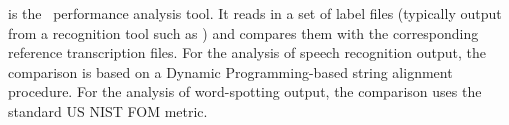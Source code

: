 %
%


\newpage
{}


 is the \HTK\ performance analysis tool.
It reads in a set of label files (typically output
from a recognition tool such as ) and compares them
with the corresponding reference transcription files.  
For the analysis of speech recognition output, the comparison
is based on a Dynamic Programming-based string alignment procedure.
For the analysis of word-spotting output, the comparison
uses the standard US NIST FOM metric.

